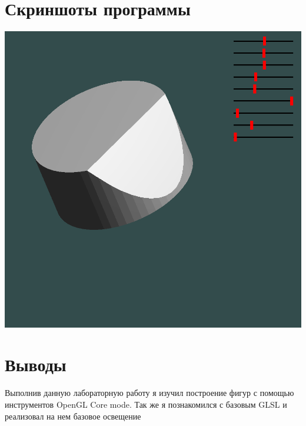 \section{Скриншоты программы}
\includegraphics[scale=0.5]{L4-5_1.png}
\section{Выводы}
Выполнив данную лабораторную работу я изучил построение фигур с помощью инструментов OpenGL Core mode.
Так же я познакомился с базовым GLSL и реализовал на нем базовое освещение
\pagebreak
